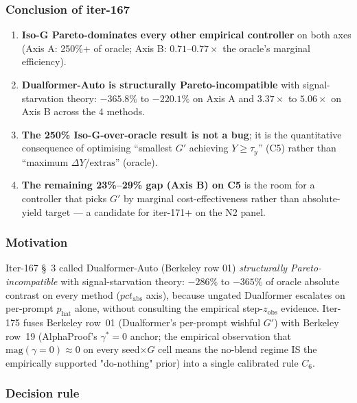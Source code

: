 \documentclass{article}
\begin{document}
\subsubsection*{Conclusion of iter-167}

\begin{enumerate}
\item \textbf{Iso-G Pareto-dominates every other empirical controller} on
      both axes (Axis A: 250\%+ of oracle; Axis B: $0.71$--$0.77\times$
      the oracle's marginal efficiency).
\item \textbf{Dualformer-Auto is structurally Pareto-incompatible} with
      signal-starvation theory: $-365.8\%$ to $-220.1\%$ on Axis A and
      $3.37\times$ to $5.06\times$ on Axis B across the 4 methods.
\item \textbf{The 250\% Iso-G-over-oracle result is not a bug}; it is the
      quantitative consequence of optimising
      ``smallest $G'$ achieving $Y \geq \tau_y$'' (C5) rather than
      ``maximum $\Delta Y / \mathrm{extras}$'' (oracle).
\item \textbf{The remaining 23\%--29\% gap (Axis B) on C5} is the room for
      a controller that picks $G'$ by marginal cost-effectiveness rather
      than absolute-yield target --- a candidate for iter-171+ on the
      N2 panel.
\end{enumerate}
 

\subsubsection*{Motivation}

Iter-167 \S~3 called Dualformer-Auto (Berkeley row 01) \emph{structurally
Pareto-incompatible} with signal-starvation theory: $-286\%$ to $-365\%$ of
oracle absolute contrast on every method ($pct_{\mathrm{abs}}$ axis),
because ungated Dualformer escalates on per-prompt $p_{\mathrm{hat}}$ alone,
without consulting the empirical step-$z_{\mathrm{obs}}$ evidence.
Iter-175 fuses Berkeley row~01 (Dualformer's per-prompt wishful $G'$) with
Berkeley row~19 (AlphaProof's $\gamma^*{=}0$ anchor; the empirical
observation that $\mathrm{mag}(\gamma{=}0) \approx 0$ on every seed$\times G$
cell means the no-blend regime IS the empirically supported "do-nothing"
prior) into a single calibrated rule $C_6$.

\subsubsection*{Decision rule}
\end{document}
